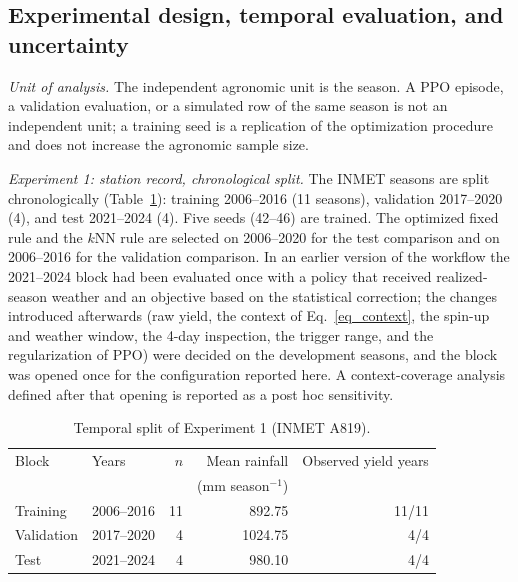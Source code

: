 \documentclass[times,final,authoryear]{elsarticle}
\begin{document}
\subsection{Experimental design, temporal evaluation, and uncertainty}
\label{subdesign}

\emph{Unit of analysis.} The independent agronomic unit is the season. A PPO episode, a validation evaluation, or a simulated row of the same season is not an independent unit; a training seed is a replication of the optimization procedure and does not increase the agronomic sample size.

\emph{Experiment 1: station record, chronological split.} The INMET seasons are split chronologically (Table~\ref{tab_temporal_registry_castro}): training 2006--2016 (11 seasons), validation 2017--2020 (4), and test 2021--2024 (4). Five seeds (42--46) are trained. The optimized fixed rule and the $k$NN rule are selected on 2006--2020 for the test comparison and on 2006--2016 for the validation comparison. In an earlier version of the workflow the 2021--2024 block had been evaluated once with a policy that received realized-season weather and an objective based on the statistical correction; the changes introduced afterwards (raw yield, the context of Eq.~\ref{eq_context}, the spin-up and weather window, the 4-day inspection, the trigger range, and the regularization of PPO) were decided on the development seasons, and the block was opened once for the configuration reported here. A context-coverage analysis defined after that opening is reported as a post hoc sensitivity.

\begin{table}[!h]
\centering
\scriptsize
\caption{Temporal split of Experiment 1 (INMET A819).}
\label{tab_temporal_registry_castro}
\begin{tabular}{llrrr}
\hline
Block & Years & $n$ & Mean rainfall & Observed yield years \\
      &       &     & (mm season$^{-1}$) & \\
\hline
Training & 2006--2016 & 11 & 892.75 & 11/11 \\
Validation & 2017--2020 & 4 & 1024.75 & 4/4 \\
Test & 2021--2024 & 4 & 980.10 & 4/4 \\
\hline
\end{tabular}
\end{table}
\end{document}
